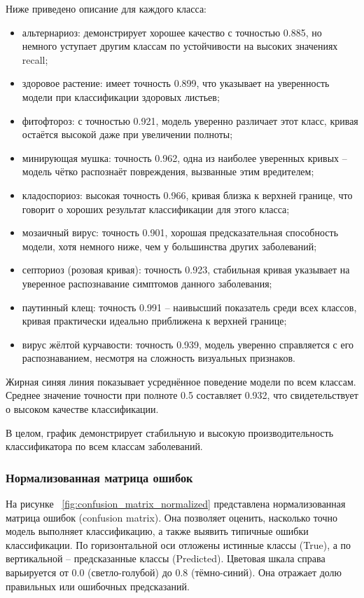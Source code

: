 {Ниже приведено описание для каждого класса:
\begin{itemize}
	\item альтернариоз: демонстрирует хорошее качество с точностью 0.885, но немного уступает другим классам по устойчивости на высоких значениях recall;
	\item здоровое растение: имеет точность 0.899, что указывает на уверенность модели при классификации здоровых листьев;
	\item фитофтороз: с точностью 0.921, модель уверенно различает этот класс, кривая остаётся высокой даже при увеличении полноты;
	\item минирующая мушка: точность 0.962, одна из наиболее уверенных кривых -- модель чётко распознаёт повреждения, вызванные этим вредителем;
	\item кладоспориоз: высокая точность 0.966, кривая близка к верхней границе, что говорит о хороших результат классификации для этого класса;
	\item мозаичный вирус: точность 0.901, хорошая предсказательная способность модели, хотя немного ниже, чем у большинства других заболеваний;
	\item септориоз (розовая кривая): точность 0.923, стабильная кривая указывает на уверенное распознавание симптомов данного заболевания;
	\item паутинный клещ: точность 0.991 -- наивысший показатель среди всех классов, кривая практически идеально приближена к верхней границе;
	\item вирус жёлтой курчавости: точность 0.939, модель уверенно справляется с его распознаванием, несмотря на сложность визуальных признаков.
\end{itemize}

Жирная синяя линия показывает усреднённое поведение модели по всем классам. Среднее значение точности при полноте 0.5 составляет 0.932, что свидетельствует о высоком качестве классификации.

В целом, график демонстрирует стабильную и высокую производительность классификатора по всем классам заболеваний.

\subsubsection{Нормализованная матрица ошибок}

На рисунке ~\ref{fig:confusion_matrix_normalized} представлена нормализованная матрица ошибок (confusion matrix). Она позволяет оценить, насколько точно модель выполняет классификацию, а также выявить типичные ошибки классификации. По горизонтальной оси отложены истинные классы (True), а по вертикальной -- предсказанные классы (Predicted). Цветовая шкала справа варьируется от 0.0 (светло-голубой) до 0.8 (тёмно-синий). Она отражает долю правильных или ошибочных предсказаний.

}
